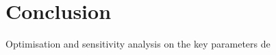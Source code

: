 \section{Conclusion} \label{sec:conclusion}


Optimisation and sensitivity analysis on the key parameters de